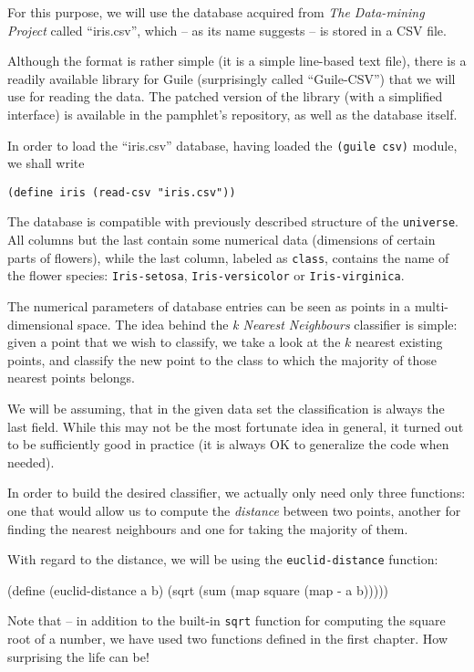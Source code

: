 For this purpose, we will use the database acquired from
\textit{The Data-mining Project} called ``iris.csv'', which
-- as its name suggests -- is stored in a CSV file.

Although the format is rather simple (it is a simple line-based
text file), there is a readily available library for Guile
(surprisingly called ``Guile-CSV'') that we will use for reading
the data. The patched version of the library (with a simplified
interface) is available in the pamphlet's repository, as well
as the database itself.

In order to load the ``iris.csv'' database, having loaded
the \texttt{(guile csv)} module, we shall write 

\texttt{(define iris (read-csv "iris.csv"))}

The database is compatible with previously described structure
of the \texttt{universe}. All columns but the last contain
some numerical data (dimensions of certain parts of flowers),
while the last column, labeled as \texttt{class}, contains
the name of the flower species: \texttt{Iris-setosa},
\texttt{Iris-versicolor} or \texttt{Iris-virginica}.

The numerical parameters of database entries can be seen
as points in a multi-dimensional space. The idea behind
the \textit{k Nearest Neighbours} classifier is simple:
given a point that we wish to classify, we take a look
at the $k$ nearest existing points, and classify the new
point to the class to which the majority of those nearest
points belongs.

We will be assuming, that in the given data set
the classification is always the last field. While
this may not be the most fortunate idea in general,
it turned out to be sufficiently good in practice
(it is always OK to generalize the code when needed).

In order to build the desired classifier, we actually
only need only three functions: one that would allow
us to compute the \textit{distance} between two points,
another for finding the nearest neighbours and one for
taking the majority of them.

With regard to the distance, we will be using the
\texttt{euclid-distance} function:

\begin{Snippet}
(define (euclid-distance a b)
  (sqrt (sum (map square (map - a b)))))
\end{Snippet}

Note that -- in addition to the built-in \texttt{sqrt} function
for computing the square root of a number, we have used two
functions defined in the first chapter. How surprising the
life can be!

